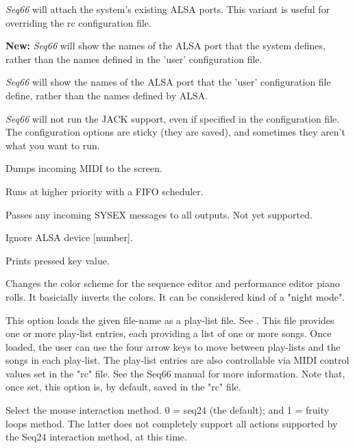       \textsl{Seq66} will attach the system's existing ALSA ports.
      This variant is useful for overriding the rc configuration file.

      \textbf{New:}
      \textsl{Seq66} will show the names of the ALSA port that the system
      defines, rather than the names defined in the 'user' configuration file.

      \textsl{Seq66} will show the names of the ALSA port that the 'user'
      configuration file define, rather than the names defined by ALSA.

      \textsl{Seq66} will not run the JACK support, even if specified
      in the configuration file.  The configuration options are sticky (they
      are saved), and sometimes they aren't what you want to run.

      Dumps incoming MIDI to the screen.

      Runs at higher priority with a FIFO scheduler.

      Passes any incoming SYSEX messages to all outputs.
		Not yet supported.

      Ignore ALSA device [number].

      Prints pressed key value.

      Changes the color scheme for the sequence editor and performance editor
      piano rolls.  It basicially inverts the colors.  It can be considered
      kind of a "night mode".

      This option loads the given file-name as a play-list file.
      See .
      This file provides one or more play-list
      entries, each providing a list of one or more songs.  Once loaded, the
      user can use the four arrow keys to move between play-lists and the songs
      in each play-list.  The play-list entries are also controllable via MIDI
      control values set in the "rc" file.  See the Seq66 manual for
      more information.  Note that, once set, this option is, by default, saved
      in the "rc" file.

      Select the mouse interaction method.
      0 = seq24 (the default); and 1 = fruity loops method.
      The latter does not completely support all actions supported by the Seq24
      interaction method, at this time.

